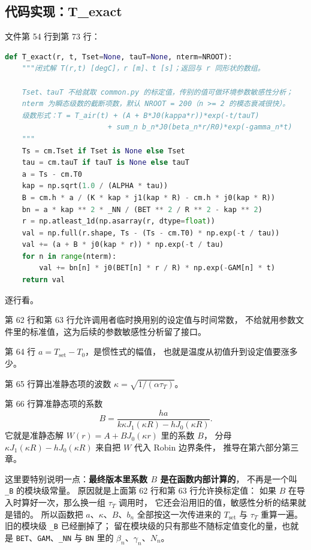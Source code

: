 \subsection{代码实现：T\_exact}

文件第 54 行到第 73 行：

\begin{lstlisting}[language=Python]
def T_exact(r, t, Tset=None, tauT=None, nterm=NROOT):
    """闭式解 T(r,t) [degC]，r [m]、t [s]；返回与 r 同形状的数组。

    Tset、tauT 不给就取 common.py 的标定值，传别的值可做环境参数敏感性分析；
    nterm 为瞬态级数的截断项数，默认 NROOT = 200（n >= 2 的模态衰减很快）。
    级数形式：T = T_air(t) + (A + B*J0(kappa*r))*exp(-t/tauT)
                        + sum_n b_n*J0(beta_n*r/R0)*exp(-gamma_n*t)
    """
    Ts = cm.Tset if Tset is None else Tset
    tau = cm.tauT if tauT is None else tauT
    a = Ts - cm.T0
    kap = np.sqrt(1.0 / (ALPHA * tau))
    B = cm.h * a / (K * kap * j1(kap * R) - cm.h * j0(kap * R))
    bn = a * kap ** 2 * _NN / (BET ** 2 / R ** 2 - kap ** 2)
    r = np.atleast_1d(np.asarray(r, dtype=float))
    val = np.full(r.shape, Ts - (Ts - cm.T0) * np.exp(-t / tau))
    val += (a + B * j0(kap * r)) * np.exp(-t / tau)
    for n in range(nterm):
        val += bn[n] * j0(BET[n] * r / R) * np.exp(-GAM[n] * t)
    return val
\end{lstlisting}

逐行看。

第 62 行和第 63 行允许调用者临时换用别的设定值与时间常数，
不给就用参数文件里的标准值，这为后续的参数敏感性分析留了接口。

第 64 行 $a=T_{\mathrm{set}}-T_0$，是惯性式的幅值，
也就是温度从初值升到设定值要涨多少。

第 65 行算出准静态项的波数
$\kappa=\sqrt{1/(\alpha\tau_T)}$。

第 66 行算准静态项的系数
\begin{equation}
B=\frac{ha}{k\kappa J_1(\kappa R)-hJ_0(\kappa R)} .
\end{equation}
它就是准静态解 $W(r)=A+BJ_0(\kappa r)$ 里的系数 $B$，
分母 $\kappa J_1(\kappa R)-hJ_0(\kappa R)$ 来自把 $W$ 代入 Robin 边界条件，
推导在第六部分第三章。

这里要特别说明一点：\textbf{最终版本里系数 $B$ 是在函数内部计算的}，
不再是一个叫 \texttt{\_B} 的模块级常量。
原因就是上面第 62 行和第 63 行允许换标定值：
如果 $B$ 在导入时算好一次，那么换一组 $\tau_T$ 调用时，
它还会沿用旧的值，敏感性分析的结果就是错的。
所以函数把 $a$、$\kappa$、$B$、$b_n$ 全部按这一次传进来的
$T_{\mathrm{set}}$ 与 $\tau_T$ 重算一遍。
旧的模块级 \texttt{\_B} 已经删掉了；
留在模块级的只有那些不随标定值变化的量，也就是
\texttt{BET}、\texttt{GAM}、\texttt{\_NN} 与 \texttt{BN} 里的
$\beta_n$、$\gamma_n$、$N_n$。

